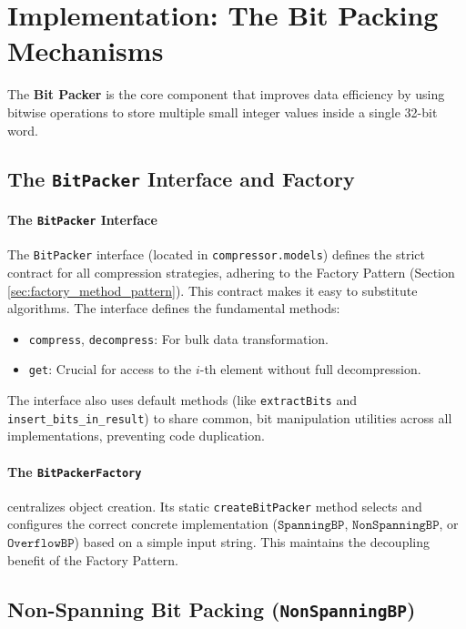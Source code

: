 \documentclass[11pt, a4paper]{article}
\begin{document}
	\section{Implementation: The Bit Packing Mechanisms}
	\label{chp:bit_packer_implementation}
	
	The \textbf{Bit Packer} is the core component that improves data efficiency by using bitwise operations to store multiple small integer values inside a single 32-bit word.
	
	\subsection{The \texttt{BitPacker} Interface and Factory}
	\label{sec:bitpacker_interface}
	
	\paragraph{The \texttt{BitPacker} Interface}
	The \texttt{BitPacker} interface (located in \texttt{compressor.models}) defines the strict contract for all compression strategies, adhering to the Factory Pattern (Section \ref{sec:factory_method_pattern}). This contract makes it easy to substitute algorithms. The interface defines the fundamental methods:
	\begin{itemize}
		\item \texttt{compress}, \texttt{decompress}: For bulk data transformation.
		\item \texttt{get}: Crucial for access to the $i$-th element without full decompression.
	\end{itemize}
	The interface also uses default methods (like \texttt{extractBits} and \texttt{insert\_bits\_in\_result}) to share common, bit manipulation utilities across all implementations, preventing code duplication.
	
	\paragraph{The \texttt{BitPackerFactory}}
	centralizes object creation. Its static \texttt{createBitPacker} method selects and configures the correct concrete implementation ($\texttt{SpanningBP}$, $\texttt{NonSpanningBP}$, or $\texttt{OverflowBP}$) based on a simple input string. This maintains the decoupling benefit of the Factory Pattern.
	
	\subsection{Non-Spanning Bit Packing (\texttt{NonSpanningBP})}
	\label{sec:nonspanning_bp}
	
\end{document}
